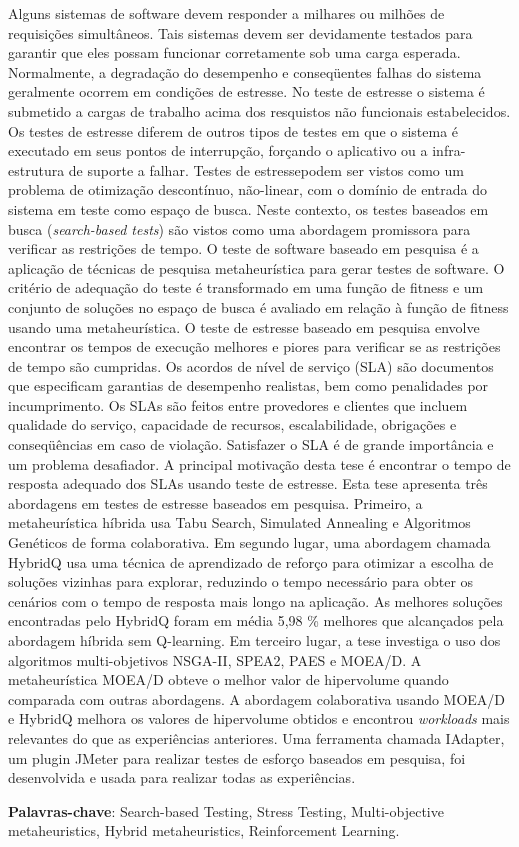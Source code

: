 
\begin{resumo} 
 
Alguns sistemas de software devem responder a milhares ou milhões de requisições simultâneos. Tais sistemas devem ser devidamente testados para garantir que eles possam funcionar corretamente sob uma carga esperada. Normalmente, a degradação do desempenho e conseqüentes falhas do sistema geralmente ocorrem em condições de estresse. No teste de estresse o sistema é submetido a cargas de trabalho acima dos resquistos não funcionais estabelecidos. Os testes de estresse diferem de outros tipos de testes em que o sistema é executado em seus pontos de interrupção, forçando o aplicativo ou a infra-estrutura de suporte a falhar. Testes de estressepodem ser vistos como um problema de otimização descontínuo, não-linear, com o domínio de entrada do sistema em teste como espaço de busca. Neste contexto, os testes baseados em busca (\textit{search-based tests}) são vistos como uma abordagem promissora para verificar as restrições de tempo. O teste de software baseado em pesquisa é a aplicação de técnicas de pesquisa metaheurística para gerar testes de software. O critério de adequação do teste é transformado em uma função de fitness e um conjunto de soluções no espaço de busca é avaliado em relação à função de fitness usando uma metaheurística. O teste de estresse baseado em pesquisa envolve encontrar os tempos de execução melhores e piores para verificar se as restrições de tempo são cumpridas. Os acordos de nível de serviço (SLA) são documentos que especificam garantias de desempenho realistas, bem como penalidades por incumprimento. Os SLAs são feitos entre provedores e clientes que incluem qualidade do serviço, capacidade de recursos, escalabilidade, obrigações e conseqüências em caso de violação. Satisfazer o SLA é de grande importância e um problema desafiador. A principal motivação desta tese é encontrar o tempo de resposta adequado dos SLAs usando teste de estresse. Esta tese apresenta três abordagens em testes de estresse baseados em pesquisa. Primeiro, a metaheurística híbrida usa Tabu Search, Simulated Annealing e Algoritmos Genéticos de forma colaborativa. Em segundo lugar, uma abordagem chamada HybridQ usa uma técnica de aprendizado de reforço para otimizar a escolha de soluções vizinhas para explorar, reduzindo o tempo necessário para obter os cenários com o tempo de resposta mais longo na aplicação. As melhores soluções encontradas pelo HybridQ foram em média 5,98 \% melhores que alcançados pela abordagem híbrida sem Q-learning. Em terceiro lugar, a tese investiga o uso dos algoritmos multi-objetivos NSGA-II, SPEA2, PAES e MOEA/D. A metaheurística MOEA/D obteve o melhor valor de hipervolume quando comparada com outras abordagens. A abordagem colaborativa usando MOEA/D e HybridQ melhora os valores de hipervolume obtidos e encontrou \textit{workloads} mais relevantes do que as experiências anteriores. Uma ferramenta chamada IAdapter, um plugin JMeter para realizar testes de esforço baseados em pesquisa, foi desenvolvida e usada para realizar todas as experiências.

\textbf{Palavras-chave}: Search-based Testing, Stress Testing, Multi-objective metaheuristics, Hybrid metaheuristics, Reinforcement Learning.

\end{resumo}

